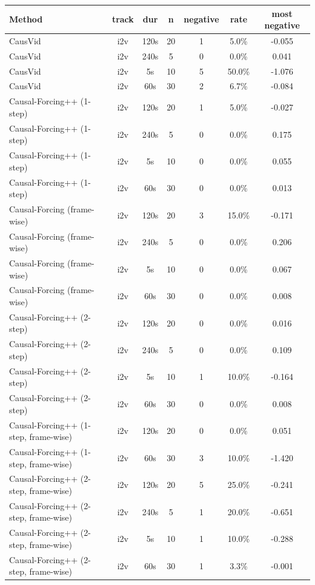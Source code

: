 \begin{table}[tb]
\centering
\scriptsize
\setlength{\tabcolsep}{5pt}
\begin{tabular}{lcccccc}
\toprule
Method & track & dur & n & negative & rate & most negative \\
\midrule
CausVid & i2v & 120s & 20 & 1 & 5.0\% & -0.055 \\
CausVid & i2v & 240s & 5 & 0 & 0.0\% & 0.041 \\
CausVid & i2v & 5s & 10 & 5 & 50.0\% & -1.076 \\
CausVid & i2v & 60s & 30 & 2 & 6.7\% & -0.084 \\
Causal-Forcing++ (1-step) & i2v & 120s & 20 & 1 & 5.0\% & -0.027 \\
Causal-Forcing++ (1-step) & i2v & 240s & 5 & 0 & 0.0\% & 0.175 \\
Causal-Forcing++ (1-step) & i2v & 5s & 10 & 0 & 0.0\% & 0.055 \\
Causal-Forcing++ (1-step) & i2v & 60s & 30 & 0 & 0.0\% & 0.013 \\
Causal-Forcing (frame-wise) & i2v & 120s & 20 & 3 & 15.0\% & -0.171 \\
Causal-Forcing (frame-wise) & i2v & 240s & 5 & 0 & 0.0\% & 0.206 \\
Causal-Forcing (frame-wise) & i2v & 5s & 10 & 0 & 0.0\% & 0.067 \\
Causal-Forcing (frame-wise) & i2v & 60s & 30 & 0 & 0.0\% & 0.008 \\
Causal-Forcing++ (2-step) & i2v & 120s & 20 & 0 & 0.0\% & 0.016 \\
Causal-Forcing++ (2-step) & i2v & 240s & 5 & 0 & 0.0\% & 0.109 \\
Causal-Forcing++ (2-step) & i2v & 5s & 10 & 1 & 10.0\% & -0.164 \\
Causal-Forcing++ (2-step) & i2v & 60s & 30 & 0 & 0.0\% & 0.008 \\
Causal-Forcing++ (1-step, frame-wise) & i2v & 120s & 20 & 0 & 0.0\% & 0.051 \\
Causal-Forcing++ (1-step, frame-wise) & i2v & 60s & 30 & 3 & 10.0\% & -1.420 \\
Causal-Forcing++ (2-step, frame-wise) & i2v & 120s & 20 & 5 & 25.0\% & -0.241 \\
Causal-Forcing++ (2-step, frame-wise) & i2v & 240s & 5 & 1 & 20.0\% & -0.651 \\
Causal-Forcing++ (2-step, frame-wise) & i2v & 5s & 10 & 1 & 10.0\% & -0.288 \\
Causal-Forcing++ (2-step, frame-wise) & i2v & 60s & 30 & 1 & 3.3\% & -0.001 \\

\end{tabular}
\end{table}
